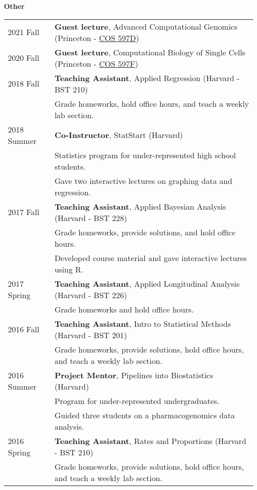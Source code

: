 \documentclass[10pt]{article}
\begin{document}
\textbf{Other}
\begin{table}[!htb]
\begin{tabular}{ll}
2021 Fall & \textbf{Guest lecture}, Advanced Computational Genomics (Princeton - \href{https://registrar.princeton.edu/course-offerings/course-details?term=1222&courseid=002125}{COS 597D}) \\
2020 Fall & \textbf{Guest lecture}, Computational Biology of Single Cells (Princeton - \href{https://registrar.princeton.edu/course-offerings/course-details?term=1212&courseid=009080}{COS 597F}) \\
2018 Fall & \textbf{Teaching Assistant}, Applied Regression (Harvard - BST 210)   \\
& Grade homeworks, hold office hours, and teach a weekly lab section.  \\
2018 Summer & \textbf{Co-Instructor}, StatStart (Harvard) \\
& Statistics program for under-represented high school students. \\
& Gave two interactive lectures on graphing data and regression. \\
2017 Fall & \textbf{Teaching Assistant}, Applied Bayesian Analysis (Harvard - BST 228)   \\
& Grade homeworks, provide solutions, and hold office hours. \\
& Developed course material and gave interactive lectures using R. \\
2017 Spring & \textbf{Teaching Assistant}, Applied Longitudinal Analysis (Harvard - BST 226)   \\
& Grade homeworks and hold office hours. \\
2016 Fall & \textbf{Teaching Assistant}, Intro to Statistical Methods (Harvard - BST 201)   \\
& Grade homeworks, provide solutions, hold office hours, and teach a weekly lab section. \\
2016 Summer & \textbf{Project Mentor}, Pipelines into Biostatistics (Harvard) \\
& Program for under-represented undergraduates. \\
& Guided three students on a pharmacogenomics data analysis. \\
2016 Spring & \textbf{Teaching Assistant}, Rates and Proportions (Harvard - BST 210)   \\
& Grade homeworks, provide solutions, hold office hours, and teach a weekly lab section.
\end{tabular}
\end{table}
\end{document}
